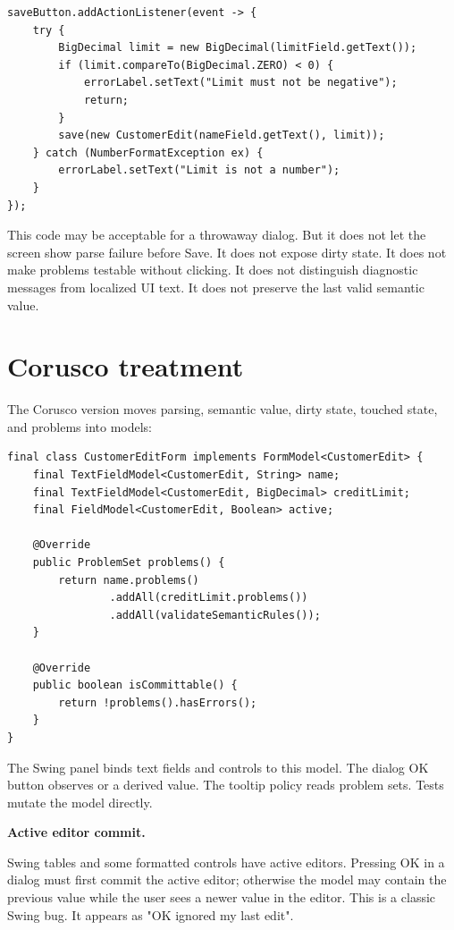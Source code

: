 \begin{lstlisting}[caption={Component-owned parsing and validation.}]
saveButton.addActionListener(event -> {
    try {
        BigDecimal limit = new BigDecimal(limitField.getText());
        if (limit.compareTo(BigDecimal.ZERO) < 0) {
            errorLabel.setText("Limit must not be negative");
            return;
        }
        save(new CustomerEdit(nameField.getText(), limit));
    } catch (NumberFormatException ex) {
        errorLabel.setText("Limit is not a number");
    }
});
\end{lstlisting}

This code may be acceptable for a throwaway dialog. But it does not let the
screen show parse failure before Save. It does not expose dirty state. It does
not make problems testable without clicking. It does not distinguish diagnostic
messages from localized UI text. It does not preserve the last valid semantic
value.

\section{Corusco treatment}

The Corusco version moves parsing, semantic value, dirty state, touched state,
and problems into models:

\begin{lstlisting}[caption={Model-owned form state.}]
final class CustomerEditForm implements FormModel<CustomerEdit> {
    final TextFieldModel<CustomerEdit, String> name;
    final TextFieldModel<CustomerEdit, BigDecimal> creditLimit;
    final FieldModel<CustomerEdit, Boolean> active;

    @Override
    public ProblemSet problems() {
        return name.problems()
                .addAll(creditLimit.problems())
                .addAll(validateSemanticRules());
    }

    @Override
    public boolean isCommittable() {
        return !problems().hasErrors();
    }
}
\end{lstlisting}

The Swing panel binds text fields and controls to this model. The dialog OK
button observes  or a derived value. The tooltip policy reads
problem sets. Tests mutate the model directly.

\textbf{Active editor commit.}

Swing tables and some formatted controls have active editors. Pressing OK in a
dialog must first commit the active editor; otherwise the model may contain the
previous value while the user sees a newer value in the editor. This is a classic
Swing bug. It appears as "OK ignored my last edit".

